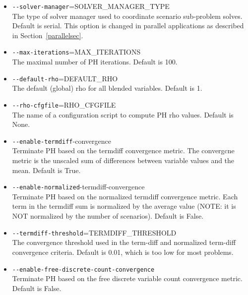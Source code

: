 \begin{itemize}
  \item \verb|--solver-manager|=SOLVER\_MANAGER\_TYPE                        \\
  The type of solver manager used to coordinate scenario sub-problem solves.
  Default is serial. This option is changed in parallel applications as
  described in Section~\ref{parallelsec}.

  \item \verb|--max-iterations|=MAX\_ITERATIONS                              \\
  The maximal number of PH iterations. Default is 100.

  \item \verb|--default-rho|=DEFAULT\_RHO                                    \\
  The default (global) rho for all blended variables. Default is 1.

  \item \verb|--rho-cfgfile|=RHO\_CFGFILE                                    \\
  The name of a configuration script to compute PH rho values. Default is None.

  \item \verb|--enable-termdiff|-convergence                                 \\
  Terminate PH based on the termdiff convergence metric. The convergcne metric
  is the unscaled sum of differences between variable values and the mean.
  Default is True.

  \item \verb|--enable-normalized|-termdiff-convergence                      \\
  Terminate PH based on the normalized termdiff convergence metric. Each term in
  the termdiff sum is normalized by the average value (NOTE: it is NOT
  normalized by the number of scenarios). Default is False.

  \item \verb|--termdiff-threshold|=TERMDIFF\_THRESHOLD                      \\
  The convergence threshold used in the term-diff and normalized term-diff
  convergence criteria. Default is 0.01, which is too low for most problems.

  \item \verb|--enable-free-discrete-count-convergence|                      \\
  Terminate PH based on the free discrete variable count convergence metric.
  Default is False.


\end{itemize}
